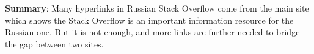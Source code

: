 \textbf{Summary}: 
Many hyperlinks in Russian Stack Overflow come from the main site which shows the Stack Overflow is an important information resource for the Russian one.
But it is not enough, and more links are further needed to bridge the gap between two sites.

